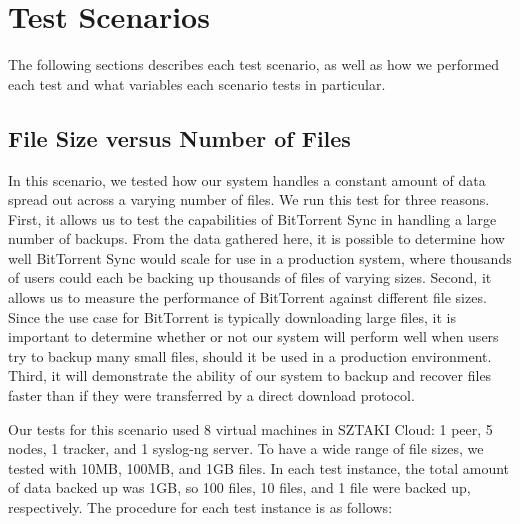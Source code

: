 \documentclass[12pt]{report}
\begin{document}
\section{Test Scenarios} \label{sec:TestScenatios_chap:Methodology}

The following sections describes each test scenario, as well as how we performed each test and what variables each scenario tests in particular.

\subsection{File Size versus Number of Files} \label{subsec:FileSizeversusNumberofFiles_sec:TestScenarios_chap:Methodology}

In this scenario, we tested how our system handles a constant amount of data spread out across a varying number of files. We run this test for three reasons. First, it allows us to test the capabilities of BitTorrent Sync in handling a large number of backups. From the data gathered here, it is possible to determine how well BitTorrent Sync would scale for use in a production system, where thousands of users could each be backing up thousands of files of varying sizes. Second, it allows us to measure the performance of BitTorrent against different file sizes. Since the use case for BitTorrent is typically downloading large files, it is important to determine whether or not our system will perform well when users try to backup many small files, should it be used in a production environment. Third, it will demonstrate the ability of our system to backup and recover files faster than if they were transferred by a direct download protocol.

Our tests for this scenario used 8 virtual machines in SZTAKI Cloud: 1 peer, 5 nodes, 1 tracker, and 1 syslog-ng server. To have a wide range of file sizes, we tested with 10MB, 100MB, and 1GB files. In each test instance, the total amount of data backed up was 1GB, so 100 files, 10 files, and 1 file were backed up, respectively. The procedure for each test instance is as follows:
\end{document}
